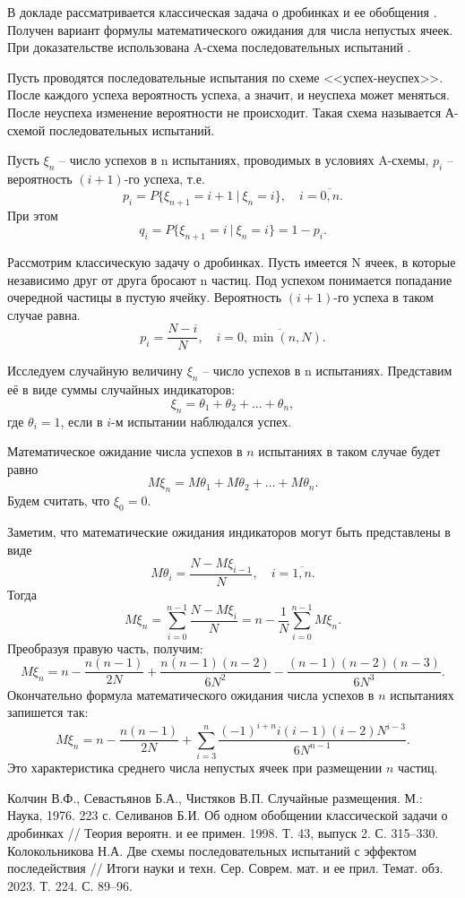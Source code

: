 
В докладе рассматривается классическая задача о дробинках и ее обобщения \cite{G1,G2}. Получен вариант формулы
математического ожидания для числа непустых ячеек. При доказательстве использована A-схема последовательных испытаний \cite{G3}.


Пусть проводятся последовательные испытания по схеме <<успех-неуспех>>. После каждого успеха вероятность успеха, а значит, и неуспеха может меняться. После неуспеха изменение вероятности не происходит. Такая схема называется А-схемой последовательных испытаний.


Пусть $\xi_n$ -- число успехов в n испытаниях, проводимых в условиях A-схемы, $p_i$ -- вероятность $(i+1)$-го успеха, т.е.
$$p_i=P\{\xi_{n+1}=i+1\ | \ \xi_n=i\}, \quad i=\overline{0,n}.$$
При этом
$$q_i=P\{\xi_{n+1}=i\ |\ \xi_n=i\}=1-p_i.$$

Рассмотрим классическую задачу о дробинках. Пусть имеется N ячеек, в которые независимо друг от друга бросают n частиц. Под успехом понимается попадание очередной частицы в пустую ячейку. Вероятность $(i+1)$-го успеха в таком случае равна.
$$p_i=\frac{N-i}{N},\quad i=\overline{0,\min(n,N)}.$$

Исследуем случайную величину $\xi_n$ -- число успехов в n испытаниях.  Представим её в виде суммы случайных индикаторов:
$$\xi_n=\theta_1+\theta_2+...+\theta_n,$$
где $\theta_i = 1$, если в $i$-м испытании  наблюдался успех.

Математическое ожидание числа успехов в $n$ испытаниях в таком случае будет равно
$$M\xi_n=M\theta_1+M\theta_2+\ldots +M\theta_n.$$
Будем считать, что $\xi_0 = 0$.

Заметим, что математические ожидания индикаторов могут быть представлены в виде
$$M\theta_i=\frac{N-M\xi_{i-1}}{N},\quad i=\overline{1,n}.$$
Тогда
$$M\xi_n=\sum_{i=0}^{n-1}\frac{N-M\xi_i}{N}=n-\frac{1}{N}\sum_{i=0}^{n-1}M\xi_n.$$
Преобразуя правую часть, получим:
$$M\xi_n=n-\frac{n(n-1)}{2N}+\frac{n(n-1)(n-2)}{6N^2}-\frac{(n-1)(n-2)(n-3)}{6N^3}.$$
Окончательно формула математического ожидания числа успехов в $n$ испытаниях запишется так: 
$$M\xi_n=n-\frac{n(n-1)}{2N}+\sum_{i=3}^n\frac{(-1)^{i+n}i(i-1)(i-2)N^{i-3}}{6N^{n-1}}.$$
Это характеристика среднего числа непустых ячеек при размещении $n$ частиц.

\begin{thebibliography}{99}
Колчин В.Ф., Севастьянов Б.А., Чистяков В.П. Случайные размещения. М.:
Наука, 1976. 223 с. 
 Селиванов Б.И. Об одном обобщении классической задачи
о дробинках // Теория вероятн. и ее примен.  1998. Т. 43,
выпуск 2. С. 315--330.
 Колокольникова Н.А. Две схемы последовательных испытаний с эффектом последействия // Итоги науки и техн. Сер. Соврем. мат. и ее прил. Темат.
обз.  2023. Т. 224. С. 89--96. 
\end{thebibliography}






%
